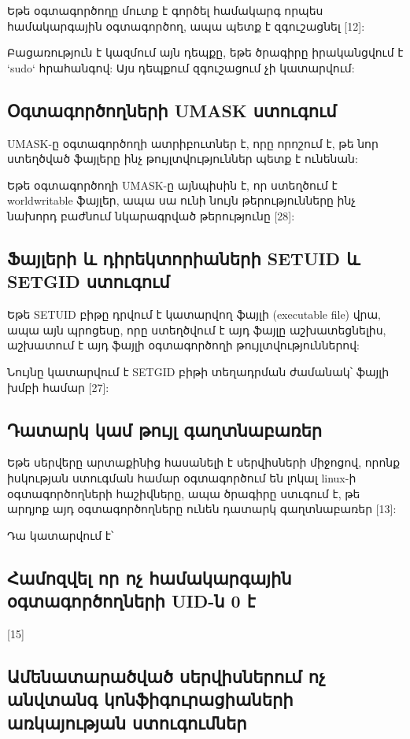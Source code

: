 \documentclass[a4paper,12pt]{article}
\begin{document}
\begin{sloppypar}
Եթե օգտագործողը մուտք է գործել համակարգ որպես
համակարգային օգտագործող, ապա պետք է զգուշացնել [12]:

Բացառություն է կազմում այն դեպքը, եթե ծրագիրը իրականցվում է
`sudo` հրահանգով: Այս դեպքում զգուշացում չի կատարվում:


\subsection{Օգտագործողների UMASK ստուգում}


UMASK-ը օգտագործողի ատրիբուտներ է, որը
որոշում է, թե նոր ստեղծված ֆայլերը ինչ թույլտվություններ
պետք է ունենան:

Եթե օգտագործողի UMASK-ը այնպիսին է, որ ստեղծում է
worldwritable ֆայլեր, ապա սա ունի նույն թերությունները
ինչ նախորդ բաժնում նկարագրված թերությունը [28]:


\subsection{Ֆայլերի և դիրեկտորիաների SETUID և SETGID ստուգում}


Եթե SETUID բիթը դրվում է կատարվող ֆայլի (executable file) վրա, ապա
այն պրոցեսը, որը ստեղծվում է այդ ֆայլը աշխատեցնելիս,
աշխատում է այդ ֆայլի օգտագործողի թույլտվություններով:

Նույնը կատարվում է SETGID բիթի տեղադրման ժամանակ՝
ֆայլի խմբի համար [27]:


\subsection{Դատարկ կամ թույլ գաղտնաբառեր}

Եթե սերվերը արտաքինից հասանելի է սերվիսների միջոցով,
որոնք իսկության ստուգման համար օգտագործում են լոկալ
linux-ի օգտագործողների հաշիվները, ապա ծրագիրը ստւգում է,
թե արդյոք այդ օգտագործողները ունեն դատարկ գաղտնաբառեր [13]:

Դա կատարվում է՝



\subsection{Համոզվել որ ոչ համակարգային օգտագործողների UID-ն 0 է}

[15]


\subsection{Ամենատարածված սերվիսներում ոչ անվտանգ կոնֆիգուրացիաների առկայության ստուգումներ}


\end{sloppypar}
\end{document}

